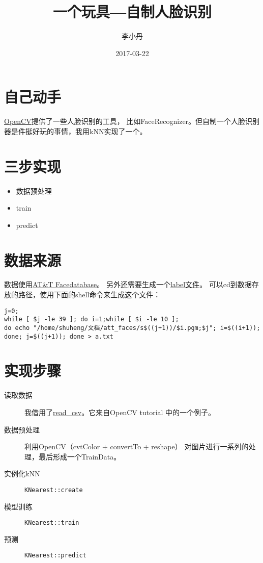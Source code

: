 \documentclass[a4paper]{article}
\begin{document}
\begin{CJK}{UTF8}{gkai}
	\title{一个玩具---自制人脸识别}
	\author{李小丹}
	\date{2017-03-22}

	\maketitle
\end{CJK}

\begin{CJK}{UTF8}{gbsn}

	\section*{自己动手}
	\href{http://opencv.org/}{OpenCV}提供了一些人脸识别的工具，
	比如FaceRecognizer。但自制一个人脸识别器是件挺好玩的事情，我用kNN实现了一个。

	\section*{三步实现}
	\begin{itemize}
		\item 数据预处理
		\item train
		\item predict
	\end{itemize}

	\section*{数据来源}
	数据使用\href{http://www.cl.cam.ac.uk/research/dtg/attarchive/facedatabase.html}
	{AT\&T Facedatabase}。
	另外还需要生成一个\href{http://docs.opencv.org/3.1.0/da/d60/tutorial_face_main.html#tutorial_face_prepare}{label文件}。
	可以cd到数据存放的路径，使用下面的shell命令来生成这个文件：
	\begin{verbatim}
j=0;
while [ $j -le 39 ]; do i=1;while [ $i -le 10 ];
do echo "/home/shuheng/文档/att_faces/s$((j+1))/$i.pgm;$j"; i=$((i+1));
done; j=$((j+1)); done > a.txt
	\end{verbatim}

	\section*{实现步骤}
	\begin{description}
		\item [读取数据] 我借用了\href{http://docs.opencv.org/3.1.0/da/d60/tutorial_face_main.html#tutorial_face_fisherfaces_use}
			{read\_csv}。它来自OpenCV tutorial \cite{tutorial}中的一个例子。
		\item [数据预处理] 利用OpenCV（cvtColor + convertTo + reshape）
			对图片进行一系列的处理，最后形成一个TrainData\cite{traindata}。
		\item [实例化kNN] {\verb|KNearest::create|}\cite{knn}
		\item [模型训练]  {\verb|KNearest::train|}\cite{knn}
		\item [预测]   {\verb|KNearest::predict|}\cite{knn}
	\end{description}


\end{CJK}
\end{document}
